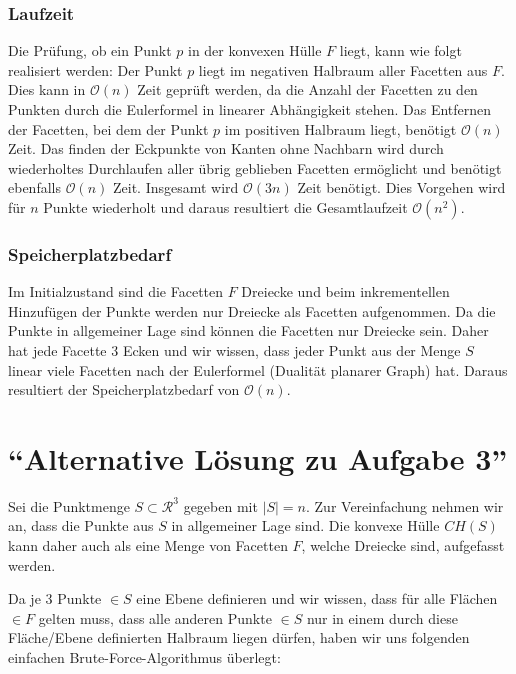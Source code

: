 \documentclass[a4paper]{article}
\begin{document}
\subsubsection*{Laufzeit}

Die Prüfung, ob ein Punkt $p$ in der konvexen Hülle $F$ liegt, kann wie folgt realisiert werden: Der Punkt $p$ liegt im negativen Halbraum aller Facetten aus $F$. Dies kann in $\mathcal{O}(n)$ Zeit geprüft werden, da die Anzahl der Facetten zu den Punkten durch die Eulerformel in linearer Abhängigkeit stehen. Das Entfernen der Facetten, bei dem der Punkt $p$ im positiven Halbraum liegt, benötigt $\mathcal{O}(n)$ Zeit. Das finden der Eckpunkte von Kanten ohne Nachbarn wird durch wiederholtes Durchlaufen aller übrig geblieben Facetten ermöglicht und benötigt ebenfalls $\mathcal{O}(n)$ Zeit. Insgesamt wird $\mathcal{O}(3n)$ Zeit benötigt. Dies Vorgehen wird für $n$ Punkte wiederholt und daraus resultiert die Gesamtlaufzeit $\mathcal{O}(n^2)$.

\subsubsection*{Speicherplatzbedarf}

Im Initialzustand sind die Facetten $F$ Dreiecke und beim inkrementellen Hinzufügen der Punkte werden nur Dreiecke als Facetten aufgenommen. Da die Punkte in allgemeiner Lage sind können die Facetten nur Dreiecke sein. Daher hat jede Facette 3 Ecken und wir wissen, dass jeder Punkt aus der Menge $S$ linear viele Facetten nach der Eulerformel (Dualität planarer Graph) hat. Daraus resultiert der Speicherplatzbedarf von $\mathcal{O}(n)$.

\section*{"`Alternative Lösung zu Aufgabe 3"'}

Sei die Punktmenge $S \subset \mathcal{R}^3$ gegeben mit $|S| = n$.
Zur Vereinfachung nehmen wir an, dass die Punkte aus $S$ in allgemeiner Lage sind.
Die konvexe Hülle $CH(S)$ kann daher auch als eine Menge von Facetten $F$, welche Dreiecke sind, 
aufgefasst werden.

Da je 3 Punkte $\in S$ eine Ebene definieren und wir wissen, dass für alle Flächen $\in F$ 
gelten muss, dass alle anderen Punkte $\in S$ nur in einem durch diese Fläche/Ebene definierten Halbraum
liegen dürfen, haben wir uns folgenden einfachen Brute-Force-Algorithmus überlegt:
\end{document}
